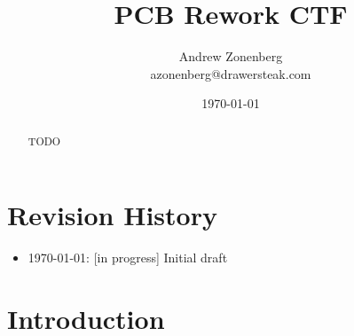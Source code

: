 \documentclass{article}
\begin{document}
\title{\vspace*{\fill}PCB Rework CTF}
\author{Andrew Zonenberg\\
azonenberg@drawersteak.com}
\date{\today}

\maketitle
\begin{abstract}
TODO
\end{abstract}
\thispagestyle{empty}

\pagebreak

\tableofcontents

\pagebreak
\section{Revision History}
\begin{itemize}
\item \today: [in progress] Initial draft
\end{itemize}

\pagebreak
\section{Introduction}
\end{document}
